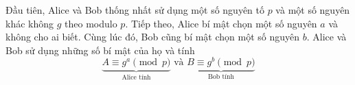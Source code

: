 
Đầu tiên, Alice và Bob thống nhất sử dụng một số nguyên tố $p$ và một số nguyên khác không $g$  theo modulo $p$. 
Tiếp theo, Alice bí mật chọn một số nguyên $a$ và không cho ai biết. Cùng lúc đó, Bob cũng bí mật chọn một số nguyên $b$.
Alice và Bob sử dụng những số bí mật của họ và tính
$$\underbrace{A \equiv g^a \pmod{p}}_{\text{Alice tính}} \text{ và } \underbrace{B \equiv g^b \pmod{p}}_{\text{Bob tính}}$$

